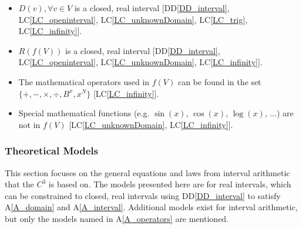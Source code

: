 \documentclass[12pt]{article}
\newcommand{\ddref}[1]{DD\ref{#1}}
\newcounter{assumpnum} %
\newcommand{\aref}[1]{A\ref{#1}}
\newcommand{\lcref}[1]{LC\ref{#1}}
\newcommand{\prognameAbbrv}{$C^{3}$}
\begin{document}
\begin{itemize}

\item[A\refstepcounter{assumpnum}\theassumpnum \label{A_domain}:] $D(v), 
\forall v \in V$ is a closed, real interval [\ddref{DD_interval}, 
\lcref{LC_openinterval}, \lcref{LC_unknownDomain}, \lcref{LC_trig}, 
\lcref{LC_infinity}]. 

\item[A\refstepcounter{assumpnum}\theassumpnum \label{A_interval}:] $R(f(V))$ 
is a closed, real interval [\ddref{DD_interval}, \lcref{LC_openinterval}, 
\lcref{LC_unknownDomain}, \lcref{LC_infinity}].

\item[A\refstepcounter{assumpnum}\theassumpnum \label{A_operators}:] The 
mathematical operators used in $f(V)$ can be found in the set $\{+, -, 
\times, \div, B^x, x^N \}$ [\lcref{LC_infinity}].

\item[A\refstepcounter{assumpnum}\theassumpnum \label{A_commonfunctions}:] 
Special mathematical functions (e.g. $\sin(x)$, $\cos(x)$, $\log(x)$, ...) are 
not in $f(V)$ [\lcref{LC_unknownDomain}, \lcref{LC_infinity}].

\end{itemize}

\subsubsection{Theoretical Models}\label{sec_theoretical}

This section focuses on the general equations and laws from interval arithmetic 
that the \prognameAbbrv{} is based on. The models presented here are for real 
intervals, which can be constrained to closed, real intervals using 
\ddref{DD_interval} to satisfy \aref{A_domain} and \aref{A_interval}. 
Additional models exist for interval arithmetic, but only the models named in 
\aref{A_operators} are mentioned.

~\newline
\end{document}

